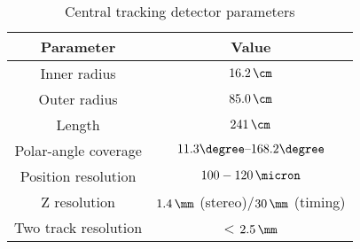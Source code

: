 \begin{table}[htbp]
	\centering
\begin{tabular}{ | c | c | }
     \hline
      Parameter & Value \\
			\hline
			\hline
			Inner radius & $16.2\,\cm$ \\ \hline
      Outer radius & $85.0\,\cm$  \\ \hline
			Length & $241\,\cm$ \\ \hline 
			Polar-angle coverage & $11.3\degree \mbox{--} 168.2\degree$ \\ \hline
			Position resolution & $100-120\,\micron$ \\ \hline
			Z resolution & $1.4\,\mm$ (stereo)/$30\,\mm$ (timing) \\ \hline
			Two track resolution & < $2.5\,\mm$ \\
      \hline
     \end{tabular}
	\caption{Central tracking detector parameters}
	\label{tab:ctdgeomparameters}
\end{table}
